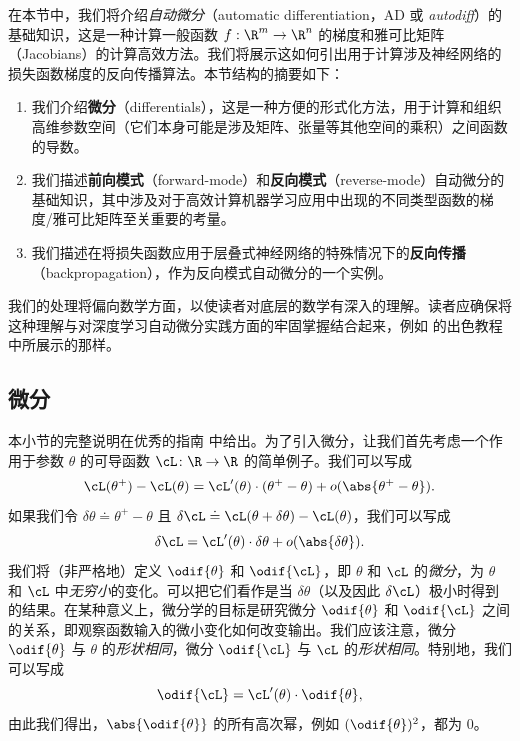\documentclass[../../book-main_zh.tex]{subfiles}
\begin{document}
在本节中，我们将介绍\textit{自动微分}（automatic differentiation，AD 或 \textit{autodiff}）的基础知识，这是一种计算一般函数 \(f: \R^{m} \to \R^{n}\) 的梯度和雅可比矩阵（Jacobians）的计算高效方法。我们将展示这如何引出用于计算涉及神经网络的损失函数梯度的反向传播算法。本节结构的摘要如下：
\begin{enumerate}
    \item 我们介绍\textbf{微分}（differentials），这是一种方便的形式化方法，用于计算和组织高维参数空间（它们本身可能是涉及矩阵、张量等其他空间的乘积）之间函数的导数。
    \item 我们描述\textbf{前向模式}（forward-mode）和\textbf{反向模式}（reverse-mode）自动微分的基础知识，其中涉及对于高效计算机器学习应用中出现的不同类型函数的梯度/雅可比矩阵至关重要的考量。
    \item 我们描述在将损失函数应用于层叠式神经网络的特殊情况下的\textbf{反向传播}（backpropagation），作为反向模式自动微分的一个实例。
\end{enumerate}

我们的处理将偏向数学方面，以使读者对底层的数学有深入的理解。读者应确保将这种理解与对深度学习自动微分实践方面的牢固掌握结合起来，例如 \textcite{karpathy-micrograd} 的出色教程中所展示的那样。

\subsection{微分}

本小节的完整说明在优秀的指南 \cite{bright2025matrix} 中给出。为了引入微分，让我们首先考虑一个作用于参数 \(\theta\) 的可导函数 \(\cL \colon
\R \to \R\) 的简单例子。我们可以写成
\begin{equation}
    \cL(\theta^{+}) - \cL(\theta) =
    \cL^{\prime}(\theta)\cdot(\theta^{+} - \theta) +
    o(\abs{\theta^{+} - \theta}).
\end{equation}
如果我们令 \(\delta\theta \doteq \theta^{+} - \theta\) 且 \(\delta\cL \doteq \cL(\theta + \delta\theta) - \cL(\theta)\)，我们可以写成
\begin{equation}
    \delta\cL = \cL^{\prime}(\theta)\cdot\delta\theta + o(\abs{\delta\theta}).
\end{equation}
我们将（非严格地）定义 \(\odif{\theta}\) 和 \(\odif{\cL}\)，即 \(\theta\) 和 \(\cL\) 的\textit{微分}，为 \(\theta\) 和 \(\cL\) 中\textit{无穷小}的变化。可以把它们看作是当 \(\delta\theta\)（以及因此 \(\delta \cL\)）极小时得到的结果。在某种意义上，微分学的目标是研究微分 \(\odif{\theta}\) 和 \(\odif{\cL}\) 之间的关系，即观察函数输入的微小变化如何改变输出。我们应该注意，微分 \(\odif{\theta}\) 与 \(\theta\) 的\textit{形状相同}，微分 \(\odif{\cL}\) 与 \(\cL\) 的\textit{形状相同}。特别地，我们可以写成
\begin{equation}
    \odif{\cL} = \cL^{\prime}(\theta)\cdot\odif{\theta},
\end{equation}
由此我们得出，\(\abs{\odif{\theta}}\) 的所有高次幂，例如 \((\odif{\theta})^{2}\)，都为 \(0\)。
\end{document}
